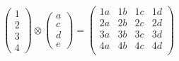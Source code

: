 \documentclass[12pt]{article}
\begin{document}
\begin{align*}
	\begin{pmatrix}
	 1\\2\\3\\4
	\end{pmatrix}
	 \otimes
	\begin{pmatrix}
	 a\\c\\d\\e
	\end{pmatrix}
	 = 
	\begin{pmatrix}
	 1a & 1b & 1c & 1d \\
	 2a & 2b & 2c & 2d \\
	 3a & 3b & 3c & 3d \\
	 4a & 4b & 4c & 4d \\
	\end{pmatrix}%
\end{align*}
\end{document}
